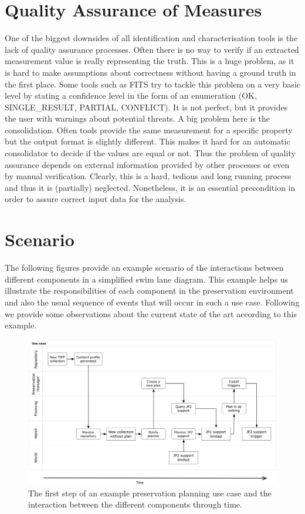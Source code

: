 \section{Quality Assurance of Measures}
One of the biggest downsides of all identification and characterisation tools is the lack of quality assurance processes. Often there is no way to verify if an extracted measurement value is really representing the truth. This is a huge problem, as it is hard to make assumptions about correctness without having a ground truth in the first place.
Some tools such as FITS try to tackle this problem on a very basic level by stating a confidence level in the form of an enumeration (OK, SINGLE\_RESULT, PARTIAL, CONFLICT). It is not perfect, but it provides the user with warnings about potential threats.
A big problem here is the consolidation. Often tools provide the same measurement for a specific property but the output format is slightly different. This makes it hard for an automatic consolidator to decide if the values are equal or not. Thus the problem of quality assurance depends on external information provided by other processes or even by manual verification. 
Clearly, this is a hard, tedious and long running process and thus it is (partially) neglected.
Nonetheless, it is an essential precondition in order to assure correct input data for the analysis.

\section{Scenario}
The following figures provide an example scenario of the interactions between different components in a simplified swim lane diagram. This example helps us illustrate the responsibilities of each component in the preservation environment and also the usual sequence of events that will occur in such a use case. Following we provide some observations about the current state of the art according to this example.

\begin{figure}[th]
\begin{center}
\includegraphics[width=6in]{figures/related/swimlane_step1.png}
\caption{The first step of an example preservation planning use case and the interaction between the different components through time.}
\label{fig:swimlane_step1}
\end{center}
\end{figure}

